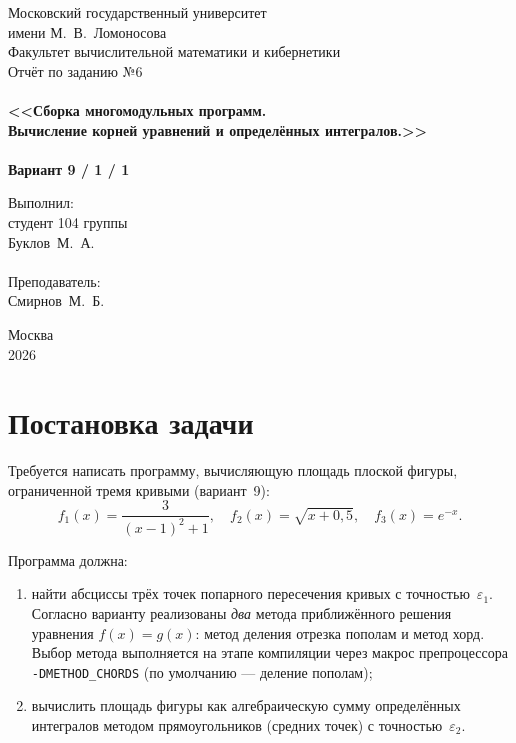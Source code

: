 \documentclass[a4paper,12pt,titlepage,finall]{article}
\begin{document}
\begin{titlepage}
    \begin{center}
        {\small \sc Московский государственный университет \\
        имени М.~В.~Ломоносова \\
        Факультет вычислительной математики и кибернетики\\}
        \vfill
        {\Large \sc Отчёт по заданию №6}\\
        ~\\
        {\large \bf <<Сборка многомодульных программ. \\
        Вычисление корней уравнений и определённых интегралов.>>}\\
        ~\\
        {\large \bf Вариант 9 / 1 / 1}
    \end{center}
    \begin{flushright}
        \vfill {Выполнил:\\
        студент 104 группы\\
        Буклов~М.~А.\\
        ~\\
        Преподаватель:\\
        Смирнов~М.~Б.}
    \end{flushright}
    \begin{center}
        \vfill
        {\small Москва\\2026}
    \end{center}
\end{titlepage}

\tableofcontents
\newpage

\section{Постановка задачи}

Требуется написать программу, вычисляющую площадь плоской фигуры, ограниченной
тремя кривыми (вариант~9):
\[
    f_1(x) = \frac{3}{(x-1)^2 + 1}, \quad
    f_2(x) = \sqrt{x + 0{,}5}, \quad
    f_3(x) = e^{-x}.
\]

Программа должна:
\begin{enumerate}
    \item найти абсциссы трёх точек попарного пересечения кривых с точностью~$\varepsilon_1$.
          Согласно варианту реализованы \emph{два} метода приближённого решения
          уравнения $f(x) = g(x)$: метод деления отрезка пополам и метод хорд.
          Выбор метода выполняется на этапе компиляции через макрос препроцессора
          \texttt{-DMETHOD\_CHORDS} (по умолчанию --- деление пополам);
    \item вычислить площадь фигуры как алгебраическую сумму определённых
          интегралов методом прямоугольников (средних точек) с точностью~$\varepsilon_2$.
\end{enumerate}
\end{document}
